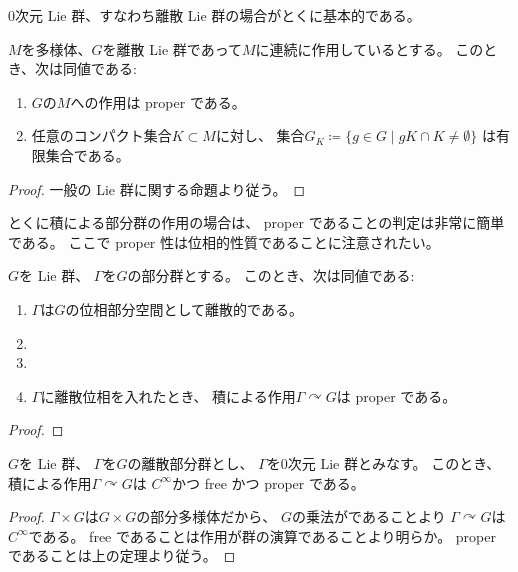 \documentclass[report]{jlreq}
\begin{document}
$0$次元 Lie 群、すなわち離散 Lie 群の場合がとくに基本的である。

\begin{proposition}
    $M$を多様体、$G$を離散 Lie 群であって$M$に連続に作用しているとする。
    このとき、次は同値である:
    \begin{enumerate}
        \item $G$の$M$への作用は proper である。
        \item 任意のコンパクト集合$K \subset M$に対し、
            集合$G_K \coloneqq \{ g \in G \mid gK \cap K \neq \emptyset \}$
            は有限集合である。
    \end{enumerate}
\end{proposition}

\begin{proof}
    一般の Lie 群に関する命題より従う。
\end{proof}

とくに積による部分群の作用の場合は、
proper であることの判定は非常に簡単である。
ここで proper 性は位相的性質であることに注意されたい。

\begin{theorem}
    $G$を Lie 群、
    $\Gamma$を$G$の部分群とする。
    このとき、次は同値である:
    \begin{enumerate}
        \item $\Gamma$は$G$の位相部分空間として離散的である。
        \item \TODO{}
        \item \TODO{}
        \item $\Gamma$に離散位相を入れたとき、
            積による作用$\Gamma \curvearrowright G$は proper である。
    \end{enumerate}
\end{theorem}

\begin{proof}
    \TODO{}
\end{proof}

\begin{corollary}
    $G$を Lie 群、
    $\Gamma$を$G$の離散部分群とし、
    $\Gamma$を$0$次元 Lie 群とみなす。
    このとき、
    積による作用$\Gamma \curvearrowright G$は
    $C^\infty$かつ free かつ proper である。
\end{corollary}

\begin{proof}
    $\Gamma \times G$は$G \times G$の部分多様体だから、
    $G$の乗法が{\smooth}であることより
    $\Gamma \curvearrowright G$は$C^\infty$である。
    free であることは作用が群の演算であることより明らか。
    proper であることは上の定理より従う。
\end{proof}
\end{document}
